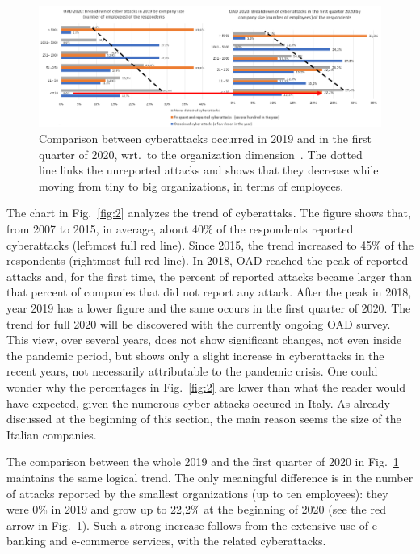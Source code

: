 \documentclass{easychair}
\begin{document}
\begin{figure}
	\begin{center}
		\includegraphics[scale=0.52]{pictures/fig3.png}
	\end{center}
  \caption{Comparison between cyberattacks occurred in 2019 and in the first quarter of 2020,
    wrt.\ to the organization dimension~\cite{oad20}. The dotted line links
    the unreported attacks and shows that they decrease while moving from tiny to big organizations,
    in terms of employees.}
  \label{fig:3}
\end{figure}

The chart in Fig.~\ref{fig:2} analyzes the trend of cyberattaks.
The figure shows that, from 2007 to 2015, in average, about 40\% of the respondents
reported cyberattacks (leftmost full red line). Since 2015, the trend increased to 45\%
of the respondents (rightmost full red line). 
In 2018, OAD reached the peak of reported attacks and, for the first time, the percent of
reported attacks became larger than that percent of companies that did not report any attack.
After the peak 
in 2018, year 2019 has a lower figure and the same occurs in the first quarter of 2020.
The trend for full 2020 will be discovered with the currently ongoing OAD survey.
This view, over several years, does not show significant changes, not even inside
the pandemic period, but shows only a slight increase in cyberattacks 
in the recent years, not necessarily attributable to the pandemic crisis. One could wonder
why the percentages in Fig.~\ref{fig:2} are lower than what the reader would have expected, 
given the numerous cyber attacks occured in Italy. As already discussed at the beginning of 
this section, the main reason seems the size of the Italian companies.

The comparison between the whole 2019 and the first quarter of 2020
in Fig.~\ref{fig:3} maintains the same logical trend. The only meaningful difference
is in the number of attacks reported by the smallest
organizations (up to ten employees): they were 0\% in 2019 and grow up to
22,2\% at the beginning of 2020 (see the red arrow in Fig.~\ref{fig:3}).
Such a strong increase follows from the extensive use of e-banking and 
e-commerce services, with the related cyberattacks.
\end{document}
